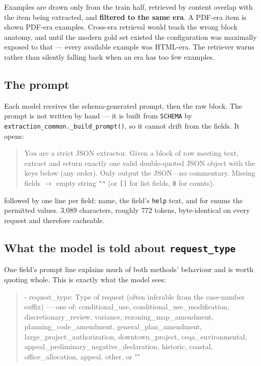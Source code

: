 \documentclass[11pt]{article}
\begin{document}
Examples are drawn only from the train half, retrieved by content overlap with the item being
extracted, and \textbf{filtered to the same era}. A PDF-era item is shown PDF-era examples.
Cross-era retrieval would teach the wrong block anatomy, and until the modern gold set existed
the configuration was maximally exposed to that --- every available example was HTML-era. The
retriever warns rather than silently falling back when an era has too few examples.

\subsection{The prompt}

Each model receives the schema-generated prompt, then the raw block. The prompt is not
written by hand --- it is built from \texttt{SCHEMA} by
\texttt{extraction\_common.\_build\_prompt()}, so it cannot drift from the fields. It opens:

\begin{quote}\small\sloppy
You are a strict JSON extractor. Given a block of raw meeting text, extract and return
exactly one valid double-quoted JSON object with the keys below (any order).
Only output the JSON---no commentary. Missing fields $\rightarrow$ empty string \texttt{""}
(or \texttt{[]} for list fields, \texttt{0} for counts).
\end{quote}

\noindent
followed by one line per field: name, the field's \texttt{help} text, and for enums the
permitted values. 3{,}089 characters, roughly 772 tokens, byte-identical on every request and
therefore cacheable.

\subsection{What the model is told about \texttt{request\_type}}
\label{sec:reqtype-prompt}

One field's prompt line explains much of both methods' behaviour and is worth quoting whole.
This is exactly what the model sees:

\begin{quote}\small\ttfamily\sloppy
- request\_type: Type of request (often inferable from the case-number suffix) --- one of:
conditional\_use, conditional\_use\_modification, discretionary\_review, variance,
rezoning\_map\_amendment, planning\_code\_amendment, general\_plan\_amendment,
large\_project\_authorization, downtown\_project, ceqa\_environmental,
appeal\_preliminary\_negative\_declaration, historic, coastal, office\_allocation, appeal,
other, or ""
\end{quote}
\end{document}
